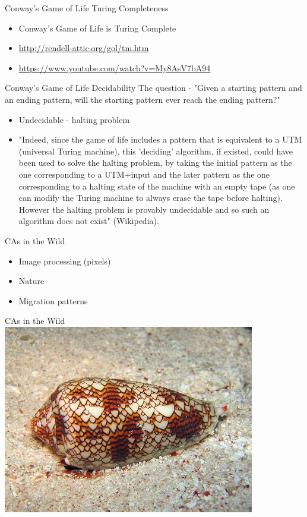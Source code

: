 \documentclass[bigger]{beamer}
\begin{document}
\begin{frame}[label=sec-21]{Conway's Game of Life Turing Completeness}
\begin{itemize}
\item Conway's Game of Life is Turing Complete
\item \url{http://rendell-attic.org/gol/tm.htm}
\item \url{https://www.youtube.com/watch?v=My8AsV7bA94}
\end{itemize}
\end{frame}
\begin{frame}[label=sec-22]{Conway's Game of Life Decidability}
The question - "Given a starting pattern and an ending pattern, will the starting pattern ever reach the ending pattern?"
\begin{itemize}
\item<2->Undecidable - halting problem
\item<3->"Indeed, since the game of life includes a pattern that is equivalent to a UTM (universal Turing machine), this 'deciding' algorithm, if existed, could have been used to solve the halting problem, by taking the initial pattern as the one corresponding to a UTM+input and the later pattern as the one corresponding to a halting state of the machine with an empty tape (as one can modify the Turing machine to always erase the tape before halting). However the halting problem is provably undecidable and so such an algorithm does not exist" (Wikipedia).
\end{itemize}
\end{frame}
\begin{frame}[label=sec-23]{CAs in the Wild}
\begin{itemize}
\item<1->Image processing (pixels)
\item<2->Nature
\item<3->Migration patterns
\end{itemize}
\end{frame}
\begin{frame}[label=sec-24]{CAs in the Wild}
\includegraphics[width=11cm]{images/shell.jpg}
\end{frame}
\end{document}
